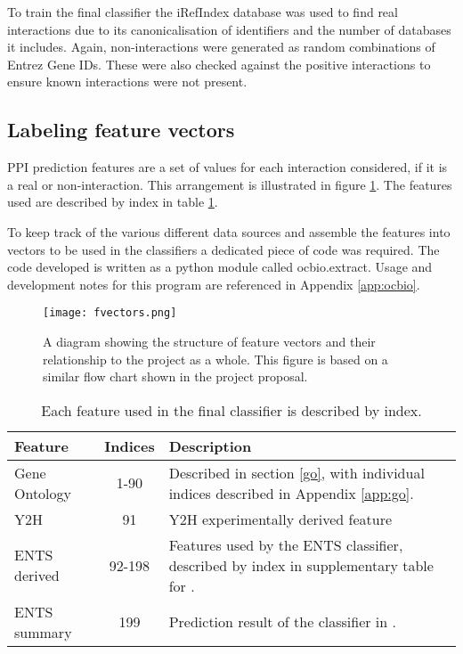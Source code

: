 To train the final classifier the iRefIndex\autocite{razick_irefindex:_2008} database was used to find real interactions due to its canonicalisation of identifiers and the number of databases it includes.
Again, non-interactions were generated as random combinations of Entrez Gene IDs.
These were also checked against the positive interactions to ensure known interactions were not present.

\subsection{Labeling feature vectors}

\ac{PPI} prediction features are a set of values for each interaction considered, if it is a real or non-interaction.
This arrangement is illustrated in figure \ref{fig:fvectors}.
The features used are described by index in table \ref{tab:fvectors}.

To keep track of the various different data sources and assemble the features into vectors to be used in the classifiers a dedicated piece of code was required.
The code developed is written as a python module called ocbio.extract.
Usage and development notes for this program are referenced in Appendix \ref{app:ocbio}.

\begin{figure}
    \centering
    \texttt{[image: fvectors.png]}
    \caption{A diagram showing the structure of feature vectors and their relationship to the project as a whole. This figure is based on a similar flow chart shown in the project proposal.}
    \label{fig:fvectors}
\end{figure}

\begin{table}
    \centering
    \begin{tabular}{l c p{}}
        Feature         & Indices & Description \\
        \hline
        Gene Ontology   & 1-90    & Described in section \ref{go}, with individual indices described in Appendix \ref{app:go}. \\
        Y2H             & 91      & Y2H experimentally derived feature \\
        ENTS derived    & 92-198  & Features used by the ENTS classifier, described by index in supplementary table for \textcite{rodgers-melnick_predicting_2013}. \\
        ENTS summary    & 199     & Prediction result of the classifier in \textcite{rodgers-melnick_predicting_2013}. \\
    \end{tabular}
    \caption{Each feature used in the final classifier is described by index.}
    \label{tab:fvectors}
\end{table}

